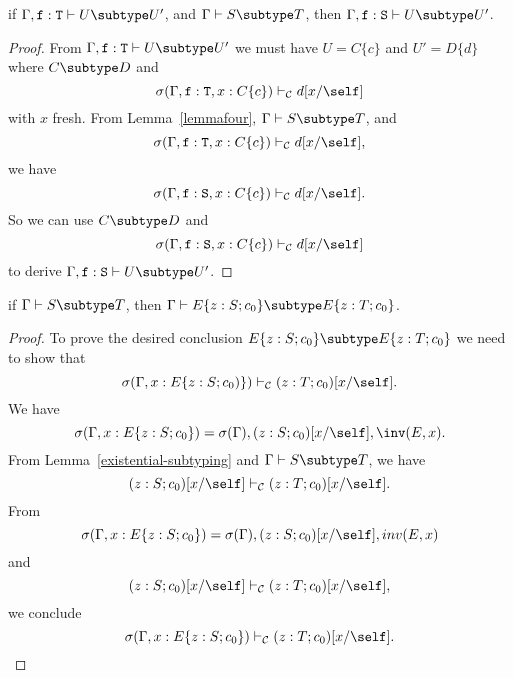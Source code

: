 \begin{lemma}
\label{lemmathree} %
if   $\Gamma, {\tt f}: {\tt T} \vdash U \subtype U'$,
and  $\Gamma \vdash S \subtype T$,
then $\Gamma, {\tt f}: {\tt S} \vdash U \subtype U'$.
\end{lemma}

\begin{proof}
From $\Gamma, {\tt f}: {\tt T} \vdash U \subtype U'$
we must have $U = C\{c\}$ and $U' = D\{d\}$
where
$C \subtype D$
and 
$$\sigma(\Gamma, {\tt f}: {\tt T}, x: C\{c\}) \vdash_{\cal C} d[x/\self]$$
with $x$ fresh.
From Lemma~\ref{lemmafour},
$\Gamma \vdash S \subtype T$,
and
$$\sigma(\Gamma, {\tt f}: {\tt T}, x: C\{c\}) \vdash_{\cal C} d[x/\self],$$
we have
$$\sigma(\Gamma, {\tt f}: {\tt S}, x: C\{c\}) \vdash_{\cal C} d[x/\self].$$
So we can use 
$C \subtype D$
and
$$\sigma(\Gamma, {\tt f}: {\tt S}, x: C\{c\}) \vdash_{\cal C} d[x/\self]$$
to derive 
$\Gamma, {\tt f}: {\tt S} \vdash U \subtype U'$.
\end{proof}

\begin{lemma}
\label{lemmafive} %
if   $\Gamma \vdash S \subtype T$,
then $\Gamma \vdash E\{z: S; c_0\} \subtype E\{z: T; c_0\}$.
\end{lemma}

\begin{proof}
To prove the desired conclusion $E\{z: S; c_0\} \subtype E\{z: T; c_0\}$ 
we need to show that
$$\sigma(\Gamma, x: E\{z: S; c_0)\}) \vdash_{\cal C} (z: T; c_0)[x/\self].$$
%
We have 
$$\sigma(\Gamma, x: E\{z: S; c_0\}) = 
 \sigma(\Gamma), (z: S; c_0)[x/\self], \inv(E,x).$$
From Lemma~\ref{existential-subtyping} and
$\Gamma \vdash S \subtype T$, 
we have
$$(z:S; c_0)[x/\self] \vdash_{\cal C} (z:T; c_0)[x/\self].$$
From $$\sigma(\Gamma, x: E\{z: S; c_0\}) =
 \sigma(\Gamma), (z: S; c_0)[x/\self], inv(E,x)$$
and
$$(z:S; c_0)[x/\self] \vdash_{\cal C} (z:T; c_0)[x/\self],$$
we conclude 
$$\sigma(\Gamma, x: E\{z: S; c_0\}) \vdash_{\cal C} (z: T; c_0)[x/\self].$$
\end{proof}

